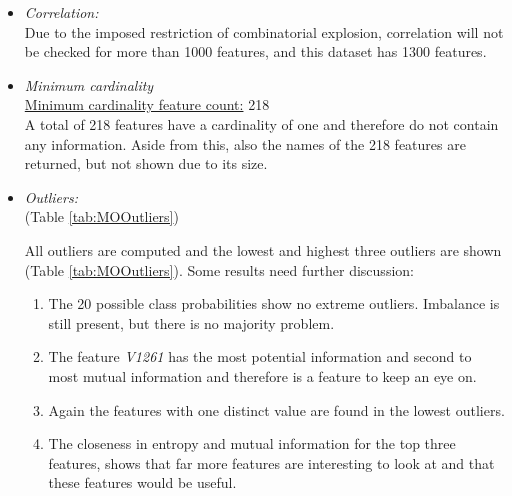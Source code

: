\documentclass[10pt,a4paper]{report}
\begin{document}
	\begin{itemize}
		\item \textit{Correlation:} \\
		
		Due to the imposed restriction of combinatorial explosion, correlation will not be checked for more than 1000 features, and this dataset has 1300 features.
		
		\item \textit{Minimum cardinality} \\
		\underline{Minimum cardinality feature count:} 218 \\
		
		A total of 218 features have a cardinality of one and therefore do not contain any information. Aside from this, also the names of the 218 features are returned, but not shown due to its size.
		
		\item \textit{Outliers:} \\
		(Table \ref{tab:MOOutliers})
		
		All outliers are computed and the lowest and highest three outliers are shown (Table \ref{tab:MOOutliers}). Some results need further discussion:
		
		\begin{enumerate}
			\item The 20 possible class probabilities show no extreme outliers. Imbalance is still present, but there is no majority problem.
			\item The feature \textit{V1261} has the most potential information and second to most mutual information and therefore is a feature to keep an eye on.
			\item Again the features with one distinct value are found in the lowest outliers.
			\item The closeness in entropy and mutual information for the top three features, shows that far more features are interesting to look at and that these features would be useful.
		\end{enumerate}
		

\end{itemize}
\end{document}
